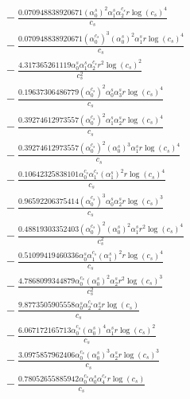 \documentclass[10pt]{article}
\begin{document}
\begin{align*}
&{}  - \frac{0.070948838920671 \left(\alpha_{0}^s\right)^{2} \alpha_{1}^s \alpha_{2}^{c_s} r \log{\left(c_{s} \right)}^{4}}{c_{s}} \\
&{}  - \frac{0.070948838920671 \left(\alpha_{0}^{c_s}\right)^{3} \left(\alpha_{0}^s\right)^{2} \alpha_{1}^s r \log{\left(c_{s} \right)}^{4}}{c_{s}} \\
&{}  - \frac{4.317365261119 \alpha_{0}^s \alpha_{1}^s \alpha_{2}^{c_s} r^{2} \log{\left(c_{s} \right)}^{2}}{c_{s}^{2}} \\
&{}  - \frac{0.19637306486779 \left(\alpha_{0}^{c_s}\right)^{2} \alpha_{0}^s \alpha_{3}^s r \log{\left(c_{s} \right)}^{4}}{c_{s}} \\
&{}  - \frac{0.39274612973557 \left(\alpha_{0}^{c_s}\right)^{2} \alpha_{1}^s \alpha_{2}^s r \log{\left(c_{s} \right)}^{4}}{c_{s}} \\
&{}  - \frac{0.39274612973557 \left(\alpha_{0}^{c_s}\right)^{2} \left(\alpha_{0}^s\right)^{3} \alpha_{1}^s r \log{\left(c_{s} \right)}^{4}}{c_{s}} \\
&{}  - \frac{0.10642325838101 \alpha_{0}^{c_s} \alpha_{1}^{c_s} \left(\alpha_{1}^s\right)^{2} r \log{\left(c_{s} \right)}^{4}}{c_{s}} \\
&{}  - \frac{0.96592206375414 \left(\alpha_{0}^{c_s}\right)^{3} \alpha_{0}^s \alpha_{2}^s r \log{\left(c_{s} \right)}^{3}}{c_{s}} \\
&{}  - \frac{0.48819303352403 \left(\alpha_{0}^{c_s}\right)^{2} \left(\alpha_{0}^s\right)^{2} \alpha_{1}^s r^{2} \log{\left(c_{s} \right)}^{4}}{c_{s}^{2}} \\
&{}  - \frac{0.51099419460336 \alpha_{0}^s \alpha_{1}^{c_s} \left(\alpha_{1}^s\right)^{2} r \log{\left(c_{s} \right)}^{4}}{c_{s}} \\
&{}  - \frac{4.7868099344879 \alpha_{0}^{c_s} \left(\alpha_{0}^s\right)^{2} \alpha_{2}^s r^{2} \log{\left(c_{s} \right)}^{3}}{c_{s}^{2}} \\
&{}  - \frac{9.8773505905558 \alpha_{0}^s \alpha_{2}^{c_s} \alpha_{2}^s r \log{\left(c_{s} \right)}}{c_{s}} \\
&{}  - \frac{6.067172165713 \alpha_{0}^{c_s} \left(\alpha_{0}^s\right)^{4} \alpha_{1}^s r \log{\left(c_{s} \right)}^{2}}{c_{s}} \\
&{}  - \frac{3.0975857962406 \alpha_{0}^{c_s} \left(\alpha_{0}^s\right)^{3} \alpha_{2}^s r \log{\left(c_{s} \right)}^{3}}{c_{s}} \\
&{}  - \frac{0.78052655885942 \alpha_{0}^{c_s} \alpha_{0}^s \alpha_{4}^{c_s} r \log{\left(c_{s} \right)}}{c_{s}} \\

\end{align*}
\end{document}
